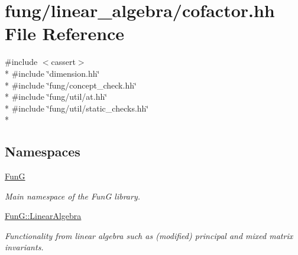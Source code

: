 \hypertarget{cofactor_8hh}{}\section{fung/linear\+\_\+algebra/cofactor.hh File Reference}
\label{cofactor_8hh}
{\ttfamily \#include $<$cassert$>$}\\*
{\ttfamily \#include \char`\"{}dimension.\+hh\char`\"{}}\\*
{\ttfamily \#include \char`\"{}fung/concept\+\_\+check.\+hh\char`\"{}}\\*
{\ttfamily \#include \char`\"{}fung/util/at.\+hh\char`\"{}}\\*
{\ttfamily \#include \char`\"{}fung/util/static\+\_\+checks.\+hh\char`\"{}}\\*
\subsection*{Namespaces}
\begin{DoxyCompactItemize}
\item 
 \hyperlink{namespaceFunG}{Fun\+G}
\begin{DoxyCompactList}\small\item\em Main namespace of the Fun\+G library. \end{DoxyCompactList}\item 
 \hyperlink{namespaceFunG_1_1LinearAlgebra}{Fun\+G\+::\+Linear\+Algebra}
\begin{DoxyCompactList}\small\item\em Functionality from linear algebra such as (modified) principal and mixed matrix invariants. \end{DoxyCompactList}\end{DoxyCompactItemize}
